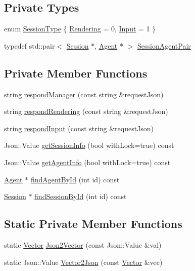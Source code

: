 \subsection*{Private Types}
\begin{DoxyCompactItemize}
\item 
enum \hyperlink{classServer_abb49932aed3c7683040e1a463e25c36c}{Session\+Type} \{ \hyperlink{classServer_abb49932aed3c7683040e1a463e25c36ca5927e9d71a6843a513199c25c2c62f82}{Rendering} = 0, 
\hyperlink{classServer_abb49932aed3c7683040e1a463e25c36cae387e75adf857bbe8390734f939efbdf}{Input} = 1
 \}
\item 
typedef std\+::pair$<$ \hyperlink{structServer_1_1Session}{Session} $\ast$, \hyperlink{classAgent}{Agent} $\ast$ $>$ \hyperlink{classServer_a5b3a89ca943df0f41fdf902a0c2147f3}{Session\+Agent\+Pair}
\end{DoxyCompactItemize}
\subsection*{Private Member Functions}
\begin{DoxyCompactItemize}
\item 
string \hyperlink{classServer_a075ea5a350e5b6052dc621411526e469}{respond\+Manager} (const string \&request\+Json)
\item 
string \hyperlink{classServer_ad542ec541766a9524fcf7d4569699c4e}{respond\+Rendering} (const string \&request\+Json)
\item 
string \hyperlink{classServer_a908709257a0191b87ac66aa509d11140}{respond\+Input} (const string \&request\+Json)
\item 
Json\+::\+Value \hyperlink{classServer_a76481ef963d4dc3478b72edd1c164f7a}{get\+Session\+Info} (bool with\+Lock=true) const 
\item 
Json\+::\+Value \hyperlink{classServer_a7c116bd269521368538c5d4836b43f9b}{get\+Agent\+Info} (bool with\+Lock=true) const 
\item 
\hyperlink{classAgent}{Agent} $\ast$ \hyperlink{classServer_a8def8e7ae4ee50c38c612e6ded9f9c94}{find\+Agent\+By\+Id} (int id) const 
\item 
\hyperlink{structServer_1_1Session}{Session} $\ast$ \hyperlink{classServer_ad43e988ffc6fb0398db3191309ff0eee}{find\+Session\+By\+Id} (int id) const 
\end{DoxyCompactItemize}
\subsection*{Static Private Member Functions}
\begin{DoxyCompactItemize}
\item 
static \hyperlink{Agent_8hpp_a5dd127bb3cb18b011cf5fd80a906e830}{Vector} \hyperlink{classServer_af46e68595c4f0729d5cb4f72f4fd6e28}{Json2\+Vector} (const Json\+::\+Value \&val)
\item 
static Json\+::\+Value \hyperlink{classServer_ae58496ca71e4c467209c98ac1af02994}{Vector2\+Json} (const \hyperlink{Agent_8hpp_a5dd127bb3cb18b011cf5fd80a906e830}{Vector} \&vec)
\end{DoxyCompactItemize}
